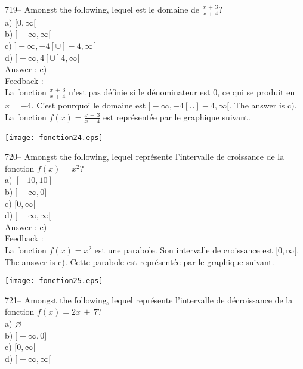 \documentclass[letterpaper, 12pt]{article}
\begin{document}
719-- Amongst the following, lequel est le domaine de
$\frac{x\,+\,3}{x\,+\,4}$?\\
a) $[0,\infty[$\\
b) $]-\infty, \infty[$\\
c) $]-\infty,-4[ \cup ]-4,\infty[$\\
d) $]-\infty,4[ \cup ]4,\infty[$\\

Answer : c)\\

Feedback :\\
La fonction $\frac{x\,+\,3}{x\,+\,4}$ n'est pas d\'efinie si le
d\'enominateur est 0, ce qui se produit en $x=-4$.  C'est pourquoi le
domaine est $]-\infty,-4[ \cup ]-4,\infty[$.  The answer is c).  La
fonction $f(x)=\frac{x\,+\,3}{x\,+\,4}$ est repr\'esent\'ee par le graphique
suivant.\\
    \begin{center}
    \texttt{[image: fonction24.eps]}
    \end{center}



720-- Amongst the following, lequel repr\'esente l'intervalle de
croissance de la fonction $f(x)=x^{2}$?\\
a) $[-10,10]$\\
b) $]-\infty,0]$\\
c) $[0,\infty[$\\
d) $]-\infty,\infty[$\\

Answer : c)\\

Feedback : \\
La fonction $f(x)=x^{2}$ est une parabole.  Son intervalle de croissance est
$[0,\infty[$.  The answer is c).  Cette parabole est repr\'esent\'ee par
le graphique suivant.\\
    \begin{center}
    \texttt{[image: fonction25.eps]}
    \end{center}


721-- Amongst the following, lequel repr\'esente l'intervalle de
d\'ecroissance de la fonction $f(x)=2x\,+\,7$?\\
a) $\varnothing$\\
b) $]-\infty,0]$\\
c) $[0,\infty[$\\
d) $]-\infty,\infty[$\\
\end{document}
